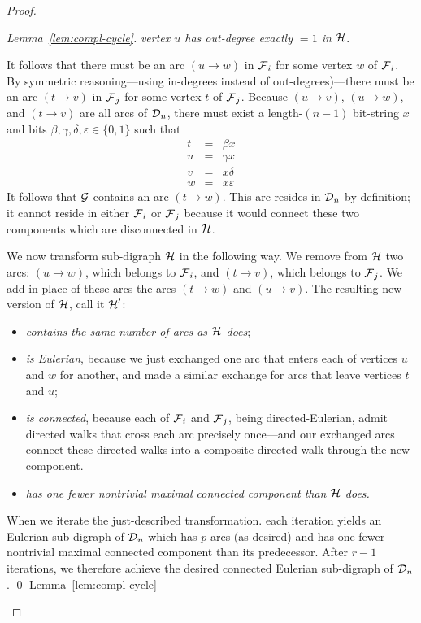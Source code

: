 \begin{proof}
\begin{proof}[Lemma~\ref{lem:compl-cycle}]
\smallskip

{\em vertex $u$ has out-degree {\em exactly} $=1$ in $\mbox{$\cal H$}$}.

\smallskip

\noindent It follows that there must be an arc $(u \rightarrow w)$ in $\mbox{$\cal F$}_i$ for some vertex $w$ of $\mbox{$\cal F$}_i$.  By symmetric reasoning---using in-degrees instead of out-degrees)---there must be an arc  $(t \rightarrow v)$ in $\mbox{$\cal F$}_j$ for some vertex $t$ of $\mbox{$\cal F$}_j$.  Because $(u \rightarrow v)$, $(u \rightarrow w)$, and $(t \rightarrow v)$ are all arcs of $\mbox{$\cal D$}_n$, there must exist a length-$(n-1)$ bit-string $x$ and bits $\beta, \gamma, \delta, \varepsilon \in \{0,1\}$ such that
\begin{eqnarray*}
t & = & \beta x    \\
u & = & \gamma x   \\
v & = & x \delta   \\
w & = & x \varepsilon
\end{eqnarray*}
It follows that $\mbox{$\cal G$}$ contains an arc $(t \rightarrow w)$.  This arc resides in $\mbox{$\cal D$}_n$ by definition; it cannot reside in either $\mbox{$\cal F$}_i$ or $\mbox{$\cal F$}_j$ because it would connect these two components which are disconnected in $\mbox{$\cal H$}$.

\medskip

We now transform sub-digraph $\mbox{$\cal H$}$ in the following way. We remove from $\mbox{$\cal H$}$ two arcs: 
$(u \rightarrow w)$, which belongs to $\mbox{$\cal F$}_i$, and $(t \rightarrow v)$, which belongs to $\mbox{$\cal F$}_j$.  We
add in place of these arcs the arcs $(t \rightarrow w)$ and $(u \rightarrow v)$.  The resulting
new version of $\mbox{$\cal H$}$, call it $\mbox{$\cal H$}'$:
\begin{itemize}
\item
{\em contains the same number of arcs as $\mbox{$\cal H$}$ does};
\medskip\item
{\em is Eulerian}, because we just exchanged one arc that enters each of vertices $u$ and $w$
for another, and made a similar exchange for arcs that leave vertices $t$ and $u$;
\medskip\item
{\em is connected}, because each of $\mbox{$\cal F$}_i$ and $\mbox{$\cal F$}_j$, being directed-Eulerian, admit directed walks that cross each arc precisely once---and our exchanged arcs connect these directed walks into a composite directed walk through the new component.
\medskip\item
{\em has one fewer nontrivial maximal connected component than $\mbox{$\cal H$}$ does.}
\end{itemize}

When we iterate the just-described transformation. each iteration yields an Eulerian sub-digraph of $\mbox{$\cal D$}_n$ which has $p$ arcs (as desired) and has one fewer nontrivial maximal connected component than its predecessor.  After $r-1$ iterations, we therefore achieve the desired connected Eulerian sub-digraph of $\mbox{$\cal D$}_n$.  \qed-Lemma~\ref{lem:compl-cycle}
\end{proof}


\end{proof}
